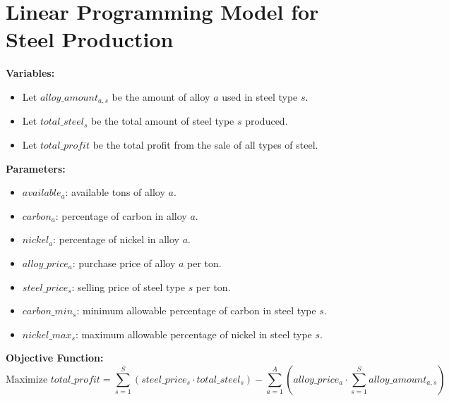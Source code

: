 \documentclass{article}
\begin{document}
\section*{Linear Programming Model for Steel Production}

\textbf{Variables:}
\begin{itemize}
    \item Let \( alloy\_amount_{a,s} \) be the amount of alloy \( a \) used in steel type \( s \).
    \item Let \( total\_steel_{s} \) be the total amount of steel type \( s \) produced.
    \item Let \( total\_profit \) be the total profit from the sale of all types of steel.
\end{itemize}

\textbf{Parameters:}
\begin{itemize}
    \item \( available_{a} \): available tons of alloy \( a \).
    \item \( carbon_{a} \): percentage of carbon in alloy \( a \).
    \item \( nickel_{a} \): percentage of nickel in alloy \( a \).
    \item \( alloy\_price_{a} \): purchase price of alloy \( a \) per ton.
    \item \( steel\_price_{s} \): selling price of steel type \( s \) per ton.
    \item \( carbon\_min_{s} \): minimum allowable percentage of carbon in steel type \( s \).
    \item \( nickel\_max_{s} \): maximum allowable percentage of nickel in steel type \( s \).
\end{itemize}

\textbf{Objective Function:}
\[
\text{Maximize } total\_profit = \sum_{s=1}^{S} (steel\_price_{s} \cdot total\_steel_{s}) - \sum_{a=1}^{A} (alloy\_price_{a} \cdot \sum_{s=1}^{S} alloy\_amount_{a,s})
\]
\end{document}
